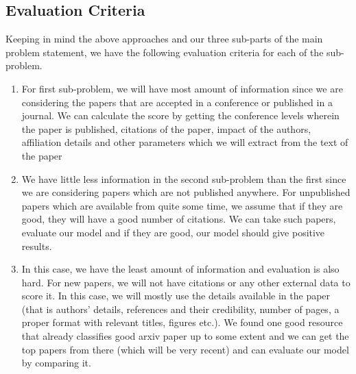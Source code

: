 \documentclass[a4paper, 11pt]{article}
\begin{document}
\subsection{Evaluation Criteria}
Keeping in mind the above approaches and our three sub-parts of the main problem statement, we have the following evaluation criteria for each of the sub-problem.
\begin{enumerate}
\item  For first sub-problem, we will have most amount of information since we are considering the papers that are accepted in a conference or published in a journal. We can calculate the score by getting the conference levels wherein the paper is published, citations of the paper, impact of the authors, affiliation details and other parameters which we will extract from the text of the paper

\item We have little less information in the second sub-problem than the first since we are considering papers which are not published anywhere. For unpublished papers which are available from quite some time, we assume that if they are good, they will have a good number of citations. We can take such papers, evaluate our model and if they are good, our model should give positive results.

\item In this case, we have the least amount of information and evaluation is also hard. For new papers, we will not have citations or any other external data to score it. In this case, we will mostly use the details available in the paper (that is authors' details, references and their credibility, number of pages, a proper format with relevant titles, figures etc.). We found one good resource \cite{scirate}  that already classifies good arxiv paper up to some extent and we can get the top papers from there (which will be very recent) and can evaluate our model by comparing it.
\end{enumerate}
\end{document}
